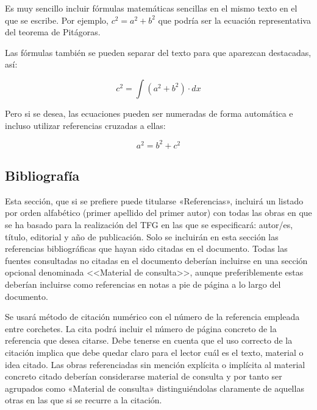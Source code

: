Es muy sencillo incluir fórmulas matemáticas sencillas en el mismo texto en el que se escribe. Por ejemplo, $c^{2}=a^{2}+b^{2}$ que podría ser la ecuación representativa del teorema de Pitágoras.

Las fórmulas también se pueden separar del texto para que aparezcan destacadas, así:

\[
c^2  = \int {\left( {a^2  + b^2} \right)}  \cdot dx
\]


Pero si se desea, las ecuaciones pueden ser numeradas de forma automática e incluso utilizar referencias cruzadas a ellas:

\begin{equation} \label{eq:pitagoras}
	a^{2}=b^{2} + c^{2}
\end{equation}




\subsection{Bibliografía}
Esta sección, que si se prefiere puede titularse 
«Referencias», incluirá un listado por orden alfabético 
(primer apellido del primer autor) con todas las obras en que se ha basado 
para la realización del TFG en las que se especificará: autor/es, 
título, editorial y año de publicación. Solo se incluirán en esta sección las 
referencias bibliográficas que hayan sido citadas en el documento. Todas las 
fuentes consultadas no citadas en el documento deberían incluirse en una 
sección opcional denominada <<Material de consulta>>, aunque preferiblemente 
estas deberían incluirse como referencias en notas a pie de página a lo largo 
del documento.

Se usará método de citación numérico con el número de la referencia empleada entre corchetes. La cita podrá incluir el número de página concreto de la referencia que desea citarse. Debe tenerse en cuenta que el uso correcto de la citación implica que debe quedar claro para el lector cuál es el texto, material o idea citado. Las obras referenciadas sin mención explícita o implícita al material concreto citado deberían considerarse material de consulta y por tanto ser agrupados como «Material de consulta» distinguiéndolas claramente de aquellas otras en las que si se recurre a la citación.

